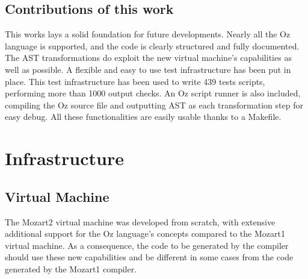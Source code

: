 \documentclass[a4paper]{memoir}
\begin{document}
\section{Contributions of this work}
This works lays a solid foundation for future developments.
Nearly all the Oz language is supported, and the code is clearly structured and fully documented.
The AST transformations do exploit the new virtual machine's capabilities as well as possible.
A flexible and easy to use test infrastructure has been put in place. This test infrastructure has been used
to write 439 tests scripts, performing more than 1000 output checks.
An Oz script runner is also included, compiling the Oz source file and outputting AST as each transformation step for easy debug.
All these functionalities are easily usable thanks to a Makefile. 

\chapter{Infrastructure}
\section{Virtual Machine}
The Mozart2 virtual machine was developed from scratch, with extensive additional support for the Oz language's concepts compared to the Mozart1 virtual machine. As a consequence, the code to be generated by the compiler should use these new capabilities and be different in some cases from the code generated by the Mozart1 compiler.
\end{document}
